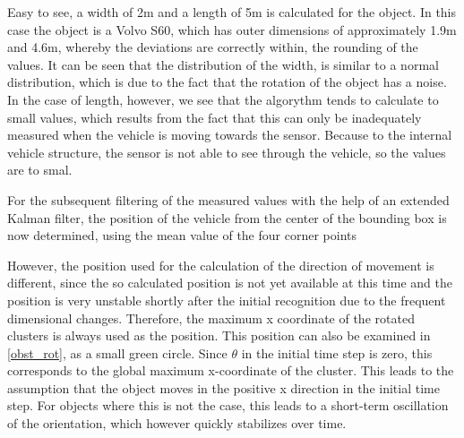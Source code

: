 \documentclass[11pt,oneside,openright]{mpreport}
\begin{document}

Easy to see, a width of 2m and a length of 5m is calculated for the object. In this case the object is a Volvo S60, which has outer dimensions of approximately
1.9m and 4.6m, whereby the deviations are correctly within, the rounding of the values. 
It can be seen that the distribution of the width, is similar to a normal distribution, which is due to the fact that the rotation of the object has a noise.
In the case of length, however, we see that the algorythm tends to calculate to small values, which results from the fact that this can only be inadequately
measured when the vehicle is moving towards the sensor. Because to the internal vehicle structure, the sensor is not able to see through the vehicle, so the
values are to smal.

For the subsequent filtering of the measured values with the help of an extended Kalman filter, 
the position of the vehicle from the center of the bounding box is now determined, using the mean value of the four corner points


However, the position used for the calculation of the direction of movement is different, since the so calculated position is not yet available at this time 
and the position is very unstable shortly after the initial recognition due to the frequent dimensional changes. Therefore, the maximum x coordinate
of the rotated clusters is always used as the position. This position can also be examined in \cref{obst_rot}, as a small green circle. Since $\theta$ in the initial time step is zero, 
this corresponds to the global maximum x-coordinate of the cluster. This leads to the assumption that the object moves in the positive x direction in the initial time step. 
For objects where this is not the case, this leads to a short-term oscillation of the orientation, which however quickly stabilizes over time.
\end{document}
